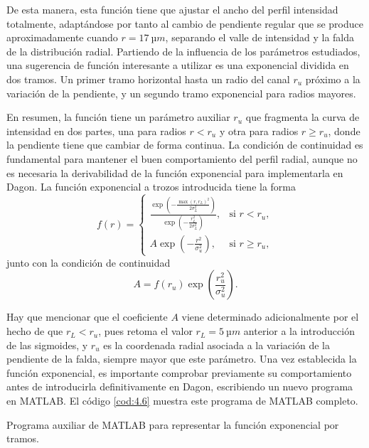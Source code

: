 De esta manera, esta función tiene que ajustar el ancho del perfil intensidad totalmente, adaptándose por tanto al cambio de pendiente regular que se produce aproximadamente cuando $r=\qty{17}{µm}$, separando el  valle de intensidad y la falda de la distribución radial. Partiendo de la influencia de los parámetros estudiados, una sugerencia de función interesante a utilizar es una exponencial dividida en dos tramos. Un primer tramo horizontal hasta un radio del canal $r_{u}$ próximo a la variación de la pendiente, y un segundo tramo exponencial para radios mayores.

En resumen, la función tiene un parámetro auxiliar $r_{u}$ que fragmenta la curva de intensidad en dos partes, una para radios $r<r_{u}$ y otra para radios $r\geq r_{u}$, donde la pendiente tiene que cambiar de forma continua. La condición de continuidad es fundamental para mantener el buen comportamiento del perfil radial, aunque no es necesaria la derivabilidad de la función exponencial para implementarla en Dagon. La función exponencial a trozos introducida tiene la forma
\begin{equation}\label{eq:4.1}
  f(r) =  
  \begin{cases}
    \frac{\exp\left(-\frac{\max(r,r_{L})^{2}}{2 \sigma_{L}^{2}}\right)}{\exp\left(-\frac{r_{L}^{2}}{2 \sigma_{L}^{2}}\right)}, & \text{si $r<r_{u}$}, \\
    A\exp\left(-\frac{r^{2}}{\sigma_{u}^{2}}\right), & \text{si $r\geq r_{u}$},
  \end{cases}
\end{equation}
junto con la condición de continuidad 
\begin{equation}\label{eq:4.2}
  A = f(r_{u})\exp\left(\frac{r_{u}^{2}}{\sigma_{u}^{2}}\right).
\end{equation}

Hay que mencionar que el coeficiente $A$ viene determinado adicionalmente por el hecho de que $r_{L}<r_{u}$, pues retoma el valor $r_{L}=\qty{5}{µm}$ anterior a la introducción de las sigmoides, y $r_{u}$ es la coordenada radial asociada a la variación de la pendiente de la falda, siempre mayor que este parámetro. Una vez establecida la función exponencial, es importante comprobar previamente su comportamiento antes de introducirla definitivamente en Dagon, escribiendo un nuevo programa en MATLAB. El código \ref{cod:4.6} muestra este programa de MATLAB completo.

\begin{listing}[htbp]
  \caption{Programa auxiliar de MATLAB para representar la función exponencial por tramos.} 
  \inputminted[firstline=1, lastline=29]{matlab}{Programas/f_trozos.m}
  \label{cod:4.6}
\end{listing}

